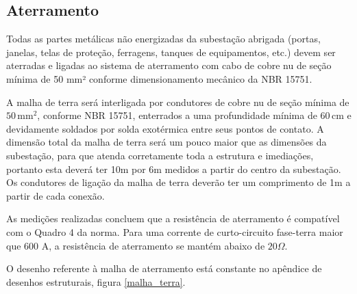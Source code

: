 \subsection{Aterramento}


Todas as partes metálicas não energizadas da subestação abrigada (portas, janelas, telas de proteção, ferragens, tanques de equipamentos, etc.) devem ser aterradas e ligadas ao sistema de aterramento com cabo de cobre nu de seção mínima de 50 mm² conforme dimensionamento mecânico da NBR 15751.

A malha de terra será interligada por condutores de cobre nu de seção mínima de $50 \,  \text{mm}^2$, conforme NBR 15751, enterrados a uma profundidade mínima de $60 \, \text{cm}$ e devidamente soldados por solda exotérmica entre seus pontos de contato. A dimensão total da malha de terra será um pouco maior que as dimensões da subestação, para que atenda corretamente toda a estrutura e imediações, portanto esta deverá ter 10m por 6m medidos a partir do centro da subestação. Os condutores de ligação da malha de terra deverão ter um comprimento de 1m a partir de cada conexão.

As medições realizadas concluem que a resistência de aterramento é compatível com o Quadro 4 da norma. Para uma corrente de curto-circuito fase-terra maior que 600 A, a resistência de aterramento se mantém abaixo de $20 \Omega$.

O desenho referente à malha de aterramento está constante no apêndice de desenhos estruturais, figura \ref{malha_terra}.
